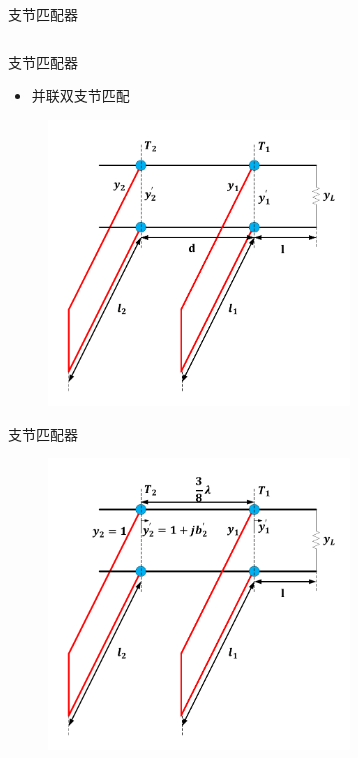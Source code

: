 \begin{frame}{支节匹配器}
\begin{columns}
\begin{column}{0.6\linewidth}
    \end{column}
  \end{columns}
\end{frame}

\begin{frame}{支节匹配器}
  \begin{itemize}
    \item 并联双支节匹配
  \end{itemize}
  \centering
  \begin{figure}
    \includegraphics[width=8cm]{Cha4//fig4-36.pdf}
  \end{figure}
\end{frame}

\begin{frame}{支节匹配器}
  
  \centering
  \begin{figure}
    \includegraphics[width=8cm]{Cha4//fig4-37.pdf}
  \end{figure}
\end{frame}

